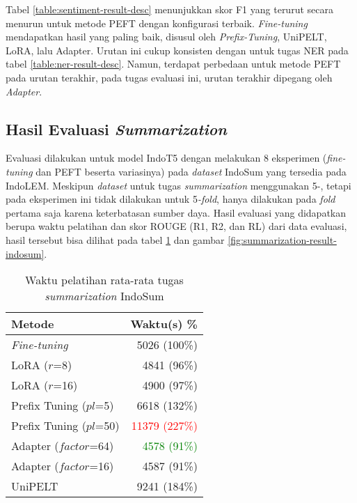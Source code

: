 Tabel \ref{table:sentiment-result-desc} menunjukkan skor F1 yang terurut secara menurun untuk metode PEFT dengan konfigurasi terbaik. \textit{Fine-tuning} mendapatkan hasil yang paling baik, disusul oleh \textit{Prefix-Tuning}, UniPELT, LoRA, lalu Adapter. Urutan ini cukup konsisten dengan untuk tugas NER pada tabel \ref{table:ner-result-desc}. Namun, terdapat perbedaan untuk metode PEFT pada urutan terakhir, pada tugas evaluasi ini, urutan terakhir dipegang oleh \textit{Adapter}.

\subsection{Hasil Evaluasi \textit{Summarization}}

Evaluasi dilakukan untuk model IndoT5 dengan melakukan 8 eksperimen (\textit{fine-tuning} dan PEFT beserta variasinya) pada \textit{dataset} IndoSum yang tersedia pada IndoLEM. Meskipun \textit{dataset} untuk tugas \textit{summarization} menggunakan 5-, tetapi pada eksperimen ini tidak dilakukan untuk 5\textit{-fold}, hanya dilakukan pada \textit{fold} pertama saja karena keterbatasan sumber daya. Hasil evaluasi yang didapatkan berupa waktu pelatihan dan skor ROUGE (R1, R2, dan RL) dari data evaluasi, hasil tersebut bisa dilihat pada tabel \ref{table:runtime-summarization-indosum} dan gambar \ref{fig:summarization-result-indosum}.

\begin{table}[h]
    \centering
    \caption{Waktu pelatihan rata-rata tugas \textit{summarization} IndoSum}
    \label{table:runtime-summarization-indosum}
    \begin{tabular}{l|r}
        \toprule
        \textbf{Metode} & \textbf{Waktu(s) \%} \\
        \midrule
        \textit{Fine-tuning} & 5026 (100\%) \\
        LoRA ($r$=8) & 4841 (96\%) \\
        LoRA ($r$=16) & 4900 (97\%) \\
        Prefix Tuning ($pl$=5) & 6618 (132\%) \\
        Prefix Tuning ($pl$=50) & \textcolor{Red}{11379 (227\%)} \\
        Adapter ($factor$=64) & \textcolor{Green}{4578 (91\%)} \\
        Adapter ($factor$=16) & 4587 (91\%) \\
        UniPELT & 9241 (184\%) \\
        \bottomrule
    \end{tabular}
\end{table}


